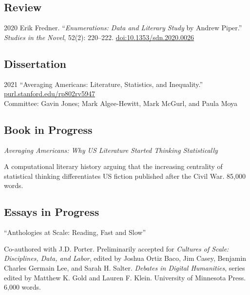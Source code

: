 \documentclass[12pt,letterpaper]{report}
\begin{document}
\subsection*{Review}

\begin{tablist}
	\item[2020] \tab{}Erik Fredner. \enquote{\emph{Enumerations: Data and Literary Study} by Andrew Piper.} \textit{Studies in the Novel}, 52(2): 220--222. \href{https://doi.org/10.1353/sdn.2020.0026}{doi:10.1353/sdn.2020.0026}
\end{tablist}

\subsection*{Dissertation}

\begin{tablist}
	\item[2021] \tab{}\enquote{Averaging Americans: Literature, Statistics, and Inequality.} \href{https://purl.stanford.edu/rp802rv5947}{purl.stanford.edu/rp802rv5947}\\
	Committee: Gavin Jones; Mark Algee-Hewitt, Mark McGurl, and Paula Moya
\end{tablist}

\subsection*{Book in Progress}

\textit{Averaging Americans: Why US Literature Started Thinking Statistically}

\begin{adjustwidth}{2em}{}A computational literary history arguing that the increasing centrality of statistical thinking differentiates US fiction published after the Civil War. 85,000 words.
\end{adjustwidth}

\subsection*{Essays in Progress}

\enquote{Anthologies at Scale: Reading, Fast and Slow}

\begin{adjustwidth}{2em}{}
	Co-authored with J.D. Porter. Preliminarily accepted for \textit{Cultures of Scale: Disciplines, Data, and Labor}, edited by Joshua Ortiz Baco, Jim Casey, Benjamin Charles Germain Lee, and Sarah H. Salter. \textit{Debates in Digital Humanities}, series edited by Matthew K. Gold and Lauren F. Klein. University of Minnesota Press. 6,000 words.
\end{adjustwidth}
\end{document}
